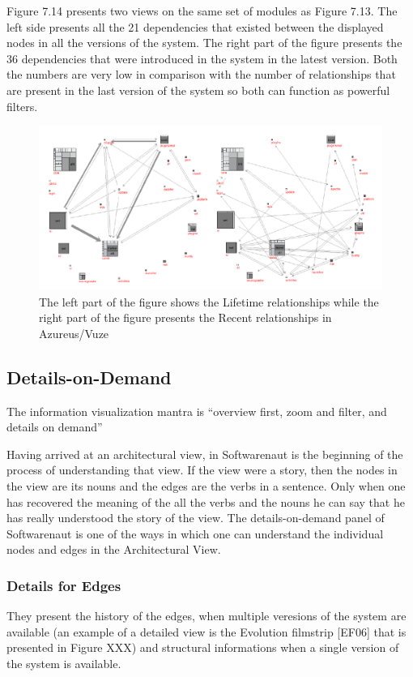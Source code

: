 \documentclass[preprint,12pt]{elsarticle}
\begin{document}
Figure 7.14 presents two views on the same set of modules as Figure 7.13. The left side presents all the 21 dependencies that existed between the displayed nodes in all the versions of the system. The right part of the figure presents the 36 dependencies that were introduced in the system in the latest version. Both the numbers are very low in comparison with the number of relationships that are present in the last version of the system so both can function as powerful filters.

\begin{figure}[h]
\begin{center}
\includegraphics[width=\linewidth]{images/Architecture-LifetimeVsRecent}
\caption{The left part of the figure shows the Lifetime relationships while the right part of the figure presents the Recent relationships in Azureus/Vuze}
\label{}
\end{center}
\end{figure}


\subsection {Details-on-Demand}

The information visualization mantra is “overview first, zoom and filter, and details on demand” 

Having arrived at an architectural view, in Softwarenaut is the beginning of the process of understanding that view. If the view were a story, then the nodes in the view are its nouns and the edges are the verbs in a sentence. Only when one has recovered the meaning of the all the verbs and the nouns he can say that he has really understood the story of the view. The details-on-demand panel of Softwarenaut is one of the ways in which one can understand the individual nodes and edges in the Architectural View.


\subsubsection {Details for Edges}
They present the history of the edges, when multiple veresions of the system are available (an example of a detailed view is the Evolution filmstrip [EF06] that is presented in Figure XXX) and structural informations when a single version of the system is available. 
\end{document}
